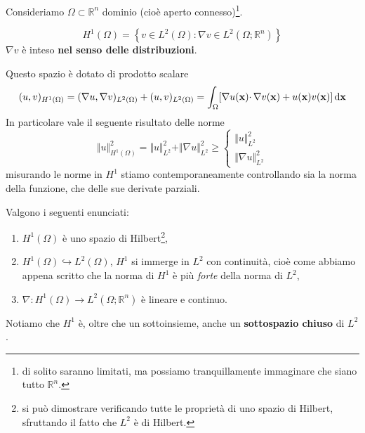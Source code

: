 Consideriamo $\Omega \subset \mathbb{R}^{n}$ dominio (cioè aperto connesso)\footnote{di solito saranno limitati, ma possiamo tranquillamente immaginare che siano tutto $\mathbb{R}^{n}$.}.
\begin{definition}
    \begin{equation*}
        H^{1}(\Omega) =\left\{v\in L^{2}(\Omega) :\nabla v\in L^{2}\left(\Omega ;\mathbb{R}^{n}\right)\right\}
    \end{equation*}
    $\nabla v$ è inteso \textbf{nel senso delle distribuzioni}.
\end{definition}
Questo spazio è dotato di prodotto scalare
\begin{equation*}
    (u,v)_{H^{1}(\Omega)} =(\nabla u,\nabla v)_{L^{2}(\Omega)} +(u,v)_{L^{2}(\Omega)} =\int _{\Omega }[ \nabla u(\mathbf{x}) \cdotp \nabla v(\mathbf{x}) +u(\mathbf{x}) v(\mathbf{x})] \,\mathrm d \mathbf{x}
\end{equation*}
In particolare vale il seguente risultato delle norme
\begin{equation*}
    \Vert u\Vert ^{2}_{H^{1}(\Omega)} =\Vert u\Vert ^{2}_{L^{2}} +\Vert \nabla u\Vert ^{2}_{L^{2}} \geqslant \begin{cases}
        \Vert u\Vert ^{2}_{L^{2}} \\
        \Vert \nabla u\Vert ^{2}_{L^{2}}
    \end{cases}
\end{equation*}
misurando le norme in $H^{1}$ stiamo contemporaneamente controllando sia la norma della funzione, che delle sue derivate parziali.
\begin{theorem}
    [Microteorema]
    Valgono i seguenti enunciati:
    \begin{enumerate}
        \item $H^{1}(\Omega)$ è uno spazio di Hilbert\footnote{si può dimostrare verificando tutte le proprietà di uno spazio di Hilbert, sfruttando il fatto che $L^{2}$ è di Hilbert.},
        \item $H^{1}(\Omega) \hookrightarrow L^{2}(\Omega)$, $H^{1}$ si immerge in $L^{2}$ con continuità, cioè come abbiamo appena scritto che la norma di $H^{1}$ è più \textit{forte} della norma di $L^{2}$,
        \item $\nabla :H^{1}(\Omega)\rightarrow L^{2}\left(\Omega ;\mathbb{R}^{n}\right)$ è lineare e continuo.
    \end{enumerate}
\end{theorem}

Notiamo che $H^{1}$ è, oltre che un sottoinsieme, anche un \textbf{sottospazio chiuso} di $L^{2}$.

